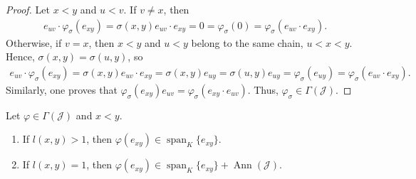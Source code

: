 \documentclass{jonasart}
\newcommand{\G}{\Gamma}
\newcommand{\J}{\mathcal{J}}
\newcommand{\sg}{\sigma}
\newcommand{\vf}{\varphi}
\DeclareMathOperator{\Ann}{Ann}
\DeclareMathOperator{\spn}{span}
\begin{document}
	\begin{proof}
		Let $x<y$ and $u<v$. If $v\ne x$, then
		\begin{align*}
			e_{uv}\cdot\vf_\sg(e_{xy})=\sg(x,y)e_{uv}\cdot e_{xy}=0=\vf_\sg(0)=\vf_\sg(e_{uv}\cdot e_{xy}).
		\end{align*}
		Otherwise, if $v=x$, then $x<y$ and $u<y$ belong to the same chain, $u<x<y$. Hence, $\sg(x,y)=\sg(u,y)$, so
		\begin{align*}
			e_{uv}\cdot\vf_\sg(e_{xy})=\sg(x,y)e_{uv}\cdot e_{xy}=\sg(x,y)e_{uy}=\sg(u,y)e_{uy}=\vf_\sg(e_{uy})=\vf_\sg(e_{uv}\cdot e_{xy}).
		\end{align*}
		Similarly, one proves that $\vf_\sg(e_{xy})e_{uv}=\vf_\sg(e_{xy}\cdot e_{uv})$. Thus, $\vf_\sg\in\G(\J)$.
	\end{proof}

	\begin{lemma}\label{vf(e_x y)-in-spn-e_x y+Ann(J)}
		Let $\vf\in\G(\J)$ and $x<y$.
		\begin{enumerate}
			\item\label{vf(e_x y)-in-span(e_x y)} If $l(x,y)>1$, then $\vf(e_{xy})\in\spn_K\{e_{xy}\}$.
			\item\label{vf(e_x y)-in-span(e_x y)+Ann} If $l(x,y)=1$, then $\vf(e_{xy})\in\spn_K\{e_{xy}\}+\Ann(\J)$.
		\end{enumerate}
	\end{lemma}
\end{document}
